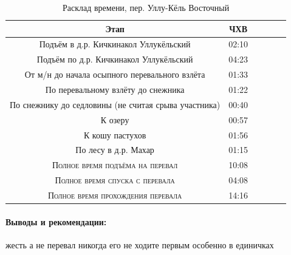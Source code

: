 \begin{table}[h!]
	\centering
	\begin{tabular}{|c|c|c|c|c|c|} 
		\hline 
		Этап & ЧХВ \\ 	
		\hline 
		Подъём в д.р. Кичкинакол Уллукёльский  & 02:10 \\
		Подъём по д.р. Кичкинакол Уллукёльский  & 04:23 \\
		От м/н до начала осыпного перевального взлёта & 01:33\\ 
		По перевальному взлёту до снежника & 01:22\\ 
		По снежнику до седловины (не считая срыва участника) & 00:40\\ 
		К озеру & 00:57 \\
		К кошу пастухов & 01:56 \\
		По лесу в д.р. Махар & 01:15 \\
		\hline
		\textsc{Полное время подъёма на перевал  }& 10:08\\
		\textsc{Полное время спуска с перевала }& 04:08 \\
	\textsc{	Полное время прохождения перевала }& 14:16 \\
		\hline
	\end{tabular}
	\caption{Расклад времени, пер. Уллу-Кёль Восточный}
\end{table}

\paragraph{Выводы и рекомендации:} жесть а не перевал никогда его не ходите первым особенно в единичках

\clearpage
